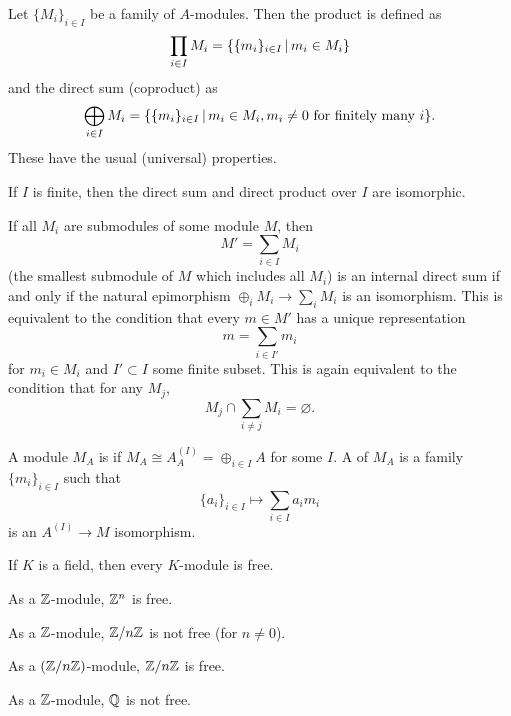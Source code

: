 Let $\{M_i\}_{i \in I}$ be a family of $A$-modules.
Then the product is defined as
\[
  \prod_{i \in I} M_i = \{ \{m_i\}_{i \in I} \,|\, m_i \in M_i \}
\]
and the direct sum (coproduct) as
\[
  \bigoplus_{i \in I} M_i = \{ \{m_i\}_{i \in I} \,|\, m_i \in M_i, \text{$m_i
	\ne 0$ for finitely many $i$} \}.
\]
These have the usual (universal) properties.

\begin{remark}
  If $I$ is finite, then the direct sum and direct product over $I$ are
  isomorphic.
\end{remark}

\begin{remark}
  If all $M_i$ are submodules of some module $M$, then
  \[
	M' = \sum_{i \in I} M_i
  \]
  (the smallest submodule of $M$ which includes all $M_i$)
  is an internal direct sum if and only if the natural epimorphism $\oplus_i M_i
  \to \sum_i M_i$ is an isomorphism.
  This is equivalent to the condition that every $m \in M'$ has a unique
  representation
  \[
	m = \sum_{i \in I'} m_i
  \]
  for $m_i \in M_i$ and $I' \subset I$ some finite subset.
  This is again equivalent to the condition that for any $M_j$,
  \[
	M_j \cap \sum_{i \ne j} M_i = \varnothing.
  \]
\end{remark}

\begin{definition}
  A module $M_A$ is  if $M_A \cong A_A^{(I)} = \oplus_{i \in I} A$
  for some $I$.
  A  of $M_A$ is a family $\{m_i\}_{i \in I}$ such that
  \[
	\{a_i\}_{i \in I} \mapsto \sum_{i \in I} a_i m_i
  \]
  is an $A^{(I)} \to M$ isomorphism.
\end{definition}

\begin{example}
  If $K$ is a field, then every $K$-module is free.
\end{example}

\begin{example}
  As a $\mathbb{Z}$-module, $\mathbb{Z}^n$ is free.
\end{example}

\begin{example}
  As a $\mathbb{Z}$-module, $\mathbb{Z} / n \mathbb{Z}$ is not free (for $n \ne 0$).
\end{example}

\begin{example}
  As a $(\mathbb{Z} / n \mathbb{Z})$-module, $\mathbb{Z} / n \mathbb{Z}$ is free.
\end{example}

\begin{example}
  As a $\mathbb{Z}$-module, $\mathbb{Q}$ is not free.
\end{example}

